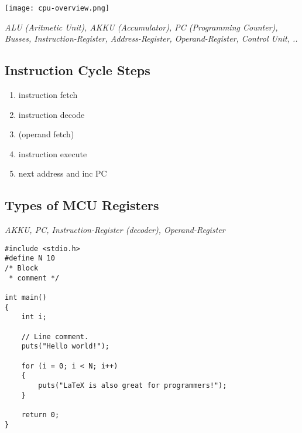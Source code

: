 \texttt{[image: cpu-overview.png]}

\textit{
    ALU (Aritmetic Unit), AKKU (Accumulator), PC (Programming Counter),
    Busses, Instruction-Register, Address-Register,
    Operand-Register, Control Unit, ..
}

\subsection{Instruction Cycle Steps}

\begin{enumerate}
    \item{instruction fetch}
    \item{instruction decode}
    \item{(operand fetch)}
    \item{instruction execute}
    \item{next address and inc PC}
\end{enumerate}

\subsection{Types of MCU Registers}

\textit{
    AKKU, PC, Instruction-Register (decoder), Operand-Register
}

\begin{lstlisting}
#include <stdio.h>
#define N 10
/* Block
 * comment */

int main()
{
    int i;

    // Line comment.
    puts("Hello world!");

    for (i = 0; i < N; i++)
    {
        puts("LaTeX is also great for programmers!");
    }

    return 0;
}
\end{lstlisting}
